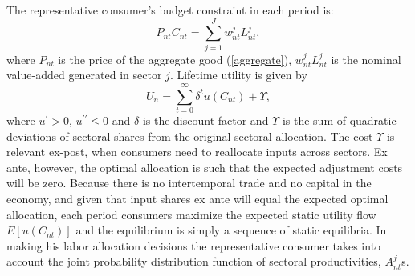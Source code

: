 \documentclass{article}
\begin{document}
The representative consumer's budget constraint in each period is: 
\begin{equation*}
P_{nt}C_{nt}=\sum_{j=1}^{J}w_{nt}^{j}L_{nt}^{j}, 
\end{equation*}%
where $P_{nt}$ is the price of the aggregate good (\ref{aggregate}), $%
w_{nt}^{j}L_{nt}^{j}$ is the nominal value-added generated in sector $j$.
Lifetime utility is given by 
\begin{equation*}
U_{n}=\sum\limits_{t=0}^{\infty }\delta ^{t}u(C_{nt})+\Upsilon , 
\end{equation*}%
where $u^{\prime }>0$, $u^{\prime \prime }\leq 0$ and $\delta $ is the
discount factor and $\Upsilon $ is the sum of quadratic deviations of
sectoral shares from the original sectoral allocation. The cost $\Upsilon $
is relevant ex-post, when consumers need to reallocate inputs across
sectors. Ex ante, however, the optimal allocation is such that the expected
adjustment costs will be zero. Because there is no intertemporal trade and
no capital in the economy, and given that input shares ex ante will equal
the expected optimal allocation, each period consumers maximize the expected
static utility flow $E\left[ u\left( C_{nt}\right) \right] $ and the
equilibrium is simply a sequence of static equilibria. In making his labor
allocation decisions the representative consumer takes into account the
joint probability distribution function of sectoral productivities, $%
A_{nt}^{j}$s.
\end{document}
